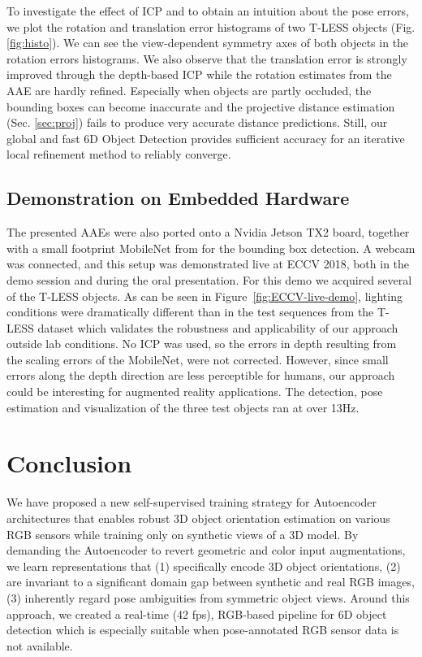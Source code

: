 {{	To investigate the effect of \gls{ICP} and to obtain an intuition about the pose errors, we plot the rotation and translation error histograms of two T-LESS objects (Fig. \ref{fig:histo}). We can see the view-dependent symmetry axes of both objects in the rotation errors histograms. We also observe that the translation error is strongly improved through the depth-based ICP while the rotation estimates from the \gls{AAE} are hardly refined. Especially when objects are partly occluded, the bounding boxes can become inaccurate and the projective distance estimation (Sec. \ref{sec:proj}) fails to produce very accurate distance predictions. Still, our global and fast 6D Object Detection provides sufficient accuracy for an iterative local refinement method to reliably converge.
	
	\subsection{Demonstration on Embedded Hardware}
	
	The presented \glspl{AAE} were also ported onto a Nvidia Jetson TX2 board, together with a small footprint MobileNet from \cite{howard2017mobilenets} for the bounding box detection. A webcam was connected, and this setup was demonstrated live at ECCV 2018, both in the demo session and during the oral presentation. For this demo we acquired several of the T-LESS objects. As can be seen in Figure~\ref{fig:ECCV-live-demo}, lighting conditions were dramatically different than in the test sequences from the T-LESS dataset which validates the robustness and applicability of our approach outside lab conditions. No ICP was used, so the errors in depth resulting from the scaling errors of the MobileNet, were not corrected. However, since small errors along the depth direction are less perceptible for humans, our approach could be interesting for augmented reality applications. The detection, pose estimation and visualization of the three test objects ran at over 13Hz.
	
	\section{Conclusion}
	We have proposed a new self-supervised training strategy for Autoencoder architectures that enables robust 3D object orientation estimation on various RGB sensors while training only on synthetic views of a 3D model. By demanding the Autoencoder to revert geometric and color input augmentations, we learn representations that (1) specifically encode 3D object orientations, (2) are invariant to a significant domain gap between synthetic and real RGB images, (3) inherently regard pose ambiguities from symmetric object views. Around this approach, we created a real-time (42 fps), RGB-based pipeline for 6D object detection which is especially suitable when pose-annotated RGB sensor data is not available.
	
}}
